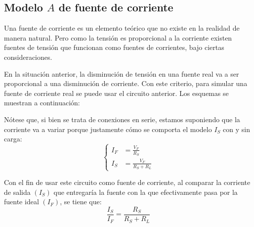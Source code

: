 \documentclass[a5paper,12pt,twoside]{book}
\begin{document}
\begin{center}
    \def\svgwidth{0.6\linewidth}
    
\end{center}


\subsection*{Modelo $A$ de fuente de corriente}

Una fuente de corriente es un elemento teórico que no existe en la realidad de manera natural. Pero como la tensión es proporcional a la corriente existen fuentes de tensión que funcionan como fuentes de corrientes, bajo ciertas consideraciones.

En la situación anterior, la disminución de tensión en una fuente real va a ser proporcional a una disminución de corriente.
Con este criterio, para simular una fuente de corriente real se puede usar el circuito anterior.
Los esquemas se muestran a continuación:

\begin{multicols}{2}
    \begin{center}
        \def\svgwidth{0.9\linewidth}
        
    \end{center}
    \begin{center}
        \def\svgwidth{0.9\linewidth}
        
    \end{center}
\end{multicols}

Nótese que, si bien se trata de conexiones en serie, estamos suponiendo que la corriente va a variar porque justamente cómo se comporta el modelo $I_S$ con y sin carga:
\begin{equation*}
    \left\{
    \begin{aligned}
        I_F &= \frac{V_F}{R_S}
        \\[1ex]
        I_S &= \frac{V_F}{R_S + R_L}
    \end{aligned}
    \right.
\end{equation*}

Con el fin de usar este circuito como fuente de corriente, al comparar la corriente de salida $(I_S)$ que entregaría la fuente con la que efectivamente pasa por la fuente ideal $(I_F)$, se tiene que:
\begin{equation*}
    \frac{I_S}{I_F} = \frac{R_S}{R_S + R_L}
\end{equation*}
\end{document}
